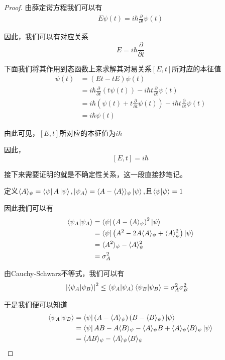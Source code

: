 \documentclass{article}
\newcommand{\expectation}[1]{\langle #1 \rangle}
\newcommand{\bek}[3]{\bra{#1}#2\ket{#3}}
\begin{document}
\begin{proof}
    由薛定谔方程我们可以有
    \begin{align*}
        E\psi(t)=i\hbar\frac{\partial}{\partial t}\psi(t)
    \end{align*}

    因此，我们可以有对应关系
    \[E=i\hbar\frac{\partial}{\partial t}\]

    下面我们将其作用到态函数上来求解其对易关系$[E,t]$所对应的本征值
    \begin{align*}
        [E,t]\psi(t)&=(Et-tE)\psi(t)\\
        &=i\hbar\frac{\partial}{\partial t}\left(t\psi(t)\right)-i\hbar t\frac{\partial}{\partial t}\psi(t)\\
        &=i\hbar\left(\psi(t)+t\frac{\partial}{\partial t}\psi(t)\right)-i\hbar t\frac{\partial}{\partial t}\psi(t)\\
        &=i\hbar\psi(t)
    \end{align*}
    
    由此可见，$[E,t]$所对应的本征值为$i\hbar$
    
    因此，\[[E,t]=i\hbar\]

    接下来需要证明的就是不确定性关系，这一段直接抄笔记。

    定义$\expectation{A}_\psi=\bek{\psi}{A}{\psi},\ket{\psi_A}=\expectation{A-\expectation{A}}_{\psi}\ket{\psi},$且$\braket{\psi}{\psi}=1$

    因此我们可以有
    \begin{align*}
        \braket{\psi_A}{\psi_A}&=\bek{\psi}{\left(A-\expectation{A}_\psi\right)^2}{\psi}\\
        &=\bek{\psi}{\left(A^2-2A\expectation{A}_\psi+\expectation{A}_\psi^2\right)}{\psi}\\
        &=\expectation{A^2}_\psi-\expectation{A}_\psi^2\\
        &=\sigma_A^2
    \end{align*}

    由Cauchy-Schwarz不等式，我们可以有
    \begin{align*}
        \left|\braket{\psi_A}{\psi_B}\right|^2&\leq \braket{\psi_A}{\psi_A}\braket{\psi_B}{\psi_B}=\sigma_A^2\sigma_B^2
    \end{align*}

    于是我们便可以知道
    \begin{align*}
        \braket{\psi_A}{\psi_B}&=\bek{\psi}{\left(A-\expectation{A}_\psi\right)\left(B-\expectation{B}_\psi\right)}{\psi}\\
        &=\bek{\psi}{AB-A\expectation{B}_\psi-\expectation{A}_\psi B+\expectation{A}_\psi\expectation{B}_\psi}{\psi}\\
        &=\expectation{AB}_\psi-\expectation{A}_\psi\expectation{B}_\psi
    \end{align*}
\end{proof}
\end{document}

